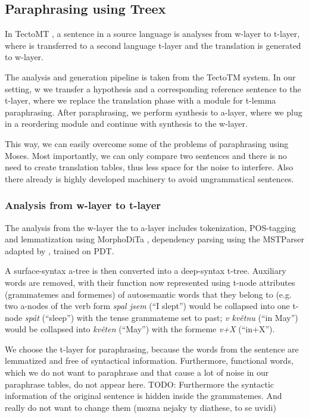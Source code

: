 \documentclass[11pt]{article}
\begin{document}
\subsection{Paraphrasing using Treex}
In TectoMT \cite{tectomt}, a sentence in a source language is analyses from 
w-layer to t-layer, where is transferred to a second language t-layer and the 
translation is generated to w-layer. 

The analysis and generation pipeline is taken from the TectoTM system. In our 
setting, w we transfer a hypothesis and a corresponding reference sentence to 
the t-layer, where we replace the translation phase with a module for t-lemma 
paraphrasing. After paraphrasing, we perform synthesis to a-layer, where we 
plug in a reordering module and continue with synthesis to the w-layer. 

This way, we can easily overcome some of the problems of paraphrasing using 
Moses. Most importantly, we can only compare two sentences and there is no need 
to create translation tables, thus less space for the noise to interfere. Also 
there already is highly developed machinery to avoid ungrammatical sentences. 

\subsubsection{Analysis from w-layer to t-layer}
The analysis from the w-layer the to a-layer includes tokenization, POS-tagging
and lemmatization using MorphoDiTa \cite{morphodita}, dependency parsing using
the MSTParser \cite{McDonald:2005} adapted by , trained on
PDT.

A surface-syntax a-tree is then converted into a deep-syntax t-tree. Auxiliary 
words are removed, with their function now represented using t-node attributes 
(grammatemes and formemes) of autosemantic words that they belong to (e.g. two
a-nodes of the verb form \textit{spal jsem} (``I slept'') would be collapsed 
into one t-node \textit{spát} (``sleep'') with the tense grammateme set to 
past; \textit{v květnu} (``in May'') would be collapsed into \textit{květen} 
(``May'') with the formeme \textit{v+X} (``in+X'').

We choose the t-layer for paraphrasing, because the words from the sentence 
are lemmatized and free of syntactical information. Furthermore, functional 
words, which we do not want to paraphrase and that cause a lot of noise in our 
paraphrase tables, do not appear here.
TODO: Furthermore the syntactic information of the original sentence is hidden
inside the grammatemes. And really do not want to change them (mozna nejaky
ty diathese, to se uvidi)
\end{document}

